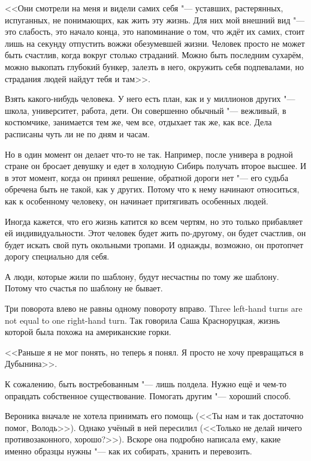 <<Они смотрели на меня и видели самих себя "--- уставших, растерянных, испуганных, не понимающих, как жить эту жизнь.
Для них мой внешний вид "--- это слабость, это начало конца, это напоминание о том, что ждёт их самих, стоит лишь на секунду отпустить вожжи обезумевшей жизни.
Человек просто не может быть счастлив, когда вокруг столько страданий.
Можно быть последним сухарём, можно выкопать глубокий бункер, залезть в него, окружить себя подпевалами, но страдания людей найдут тебя и там>>.

\textspace

Взять какого-нибудь человека.
У него есть план, как и у миллионов других "--- школа, университет, работа, дети.
Он совершенно обычный "--- вежливый, в костюмчике, занимается тем же, чем все, отдыхает так же, как все.
Дела расписаны чуть ли не по дням и часам.

Но в один момент он делает что-то не так.
Например, после универа в родной стране он бросает девушку и едет в холодную Сибирь получать второе высшее.
И в этот момент, когда он принял решение, обратной дороги нет "--- его судьба обречена быть не такой, как у других.
Потому что к нему начинают относиться, как к особенному человеку, он начинает притягивать особенных людей.

Иногда кажется, что его жизнь катится ко всем чертям, но это только прибавляет ей индивидуальности.
Этот человек будет жить по-другому, он будет счастлив, он будет искать свой путь окольными тропами.
И однажды, возможно, он протопчет дорогу специально для себя.

А люди, которые жили по шаблону, будут несчастны по тому же шаблону.
Потому что счастья по шаблону не бывает.

{Три поворота влево не равны одному повороту вправо.}
{Three left-hand turns are not equal to one right-hand turn.}
Так говорила Саша Красноруцкая, жизнь которой была похожа на американские горки.

<<Раньше я не мог понять, но теперь я понял.
Я просто не хочу превращаться в Дубынина>>.

\textspace

\label{Tue_2012_07_24}

К сожалению, быть востребованным "--- лишь полдела.
Нужно ещё и чем-то оправдать собственное существование.
Помогать другим "--- хороший способ.

Вероника вначале не хотела принимать его помощь (<<Ты нам и так достаточно помог, Володь>>).
Однако учёный в ней пересилил (<<Только не делай ничего противозаконного, хорошо?>>).
Вскоре она подробно написала ему, какие именно образцы нужны "--- как их собирать, хранить и перевозить.


